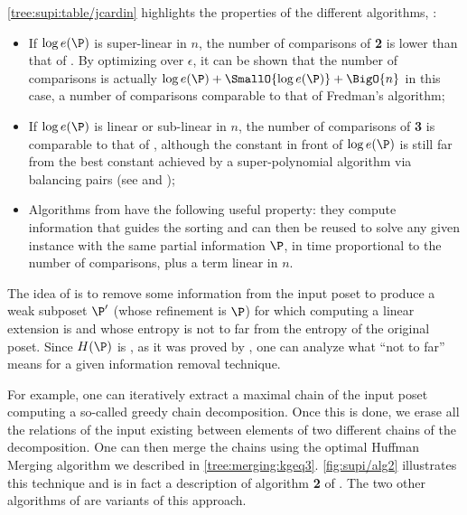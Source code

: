 \ref{tree:supi:table/jcardin} highlights the properties of the different
algorithms, \ie:

\begin{itemize}

\item If $\log e(\P)$ is super-linear in $n$, the number of comparisons of
\citet*{cardinal:2013} \textbf{2} is lower than that of \citet*{kahn:1995}. By
optimizing over $\epsilon$, it can be shown that the number of comparisons is
actually $\log e(\P) + \SmallO{\log e(\P)} + \BigO{n}$ in this case, a number of
comparisons comparable to that of Fredman’s algorithm;

\item If $\log e(\P)$ is linear or sub-linear in $n$, the number of comparisons
of \citet*{cardinal:2013} \textbf{3} is comparable to that of
\citet*{kahn:1995}, although the constant in front of $\log e(\P)$ is still far
from the best constant achieved by a super-polynomial algorithm via balancing
pairs (see \citet*{brightwell1995balancing} and
\citet*{brightwell1999balanced});

\item Algorithms from \citet*{cardinal:2013} have the following useful
property: they compute information that guides the sorting and can then be
reused to solve any given instance with the same partial information $\P$, in
time proportional to the number of comparisons, plus a term linear in $n$.

\end{itemize}

The idea of \citet*{cardinal:2013} is to remove some information from the input
poset to produce a weak subposet \(\P'\) (whose refinement is \(\P\)) for which
computing a linear extension is  and whose entropy is not to
far from the entropy of the original poset. Since \(H(\P)\) is
, as it was proved by \citet*{kahn:1995}, one can analyze what
``not to far'' means for a given information removal technique.

For example, one can iteratively extract a maximal chain of the input poset
computing a so-called greedy chain decomposition. Once this is done, we
erase all the relations of the input existing between elements of two different
chains of the decomposition. One can then merge the chains using the optimal
Huffman Merging algorithm we described in \ref{tree:merging:kgeq3}.
\ref{fig:supi/alg2} illustrates this technique and is in fact a description of
algorithm \textbf{2} of \citet{cardinal:2013}. The two other algorithms of
\citet*{cardinal:2013} are variants of this approach.

